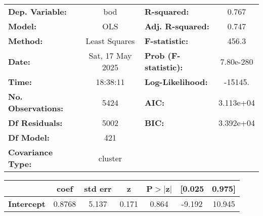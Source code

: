 \begin{center}
\begin{tabular}{lclc}
\toprule
\textbf{Dep. Variable:}                                                                             &       bod        & \textbf{  R-squared:         } &     0.767   \\
\textbf{Model:}                                                                                     &       OLS        & \textbf{  Adj. R-squared:    } &     0.747   \\
\textbf{Method:}                                                                                    &  Least Squares   & \textbf{  F-statistic:       } &     456.3   \\
\textbf{Date:}                                                                                      & Sat, 17 May 2025 & \textbf{  Prob (F-statistic):} & 7.80e-280   \\
\textbf{Time:}                                                                                      &     18:38:11     & \textbf{  Log-Likelihood:    } &   -15145.   \\
\textbf{No. Observations:}                                                                          &        5424      & \textbf{  AIC:               } & 3.113e+04   \\
\textbf{Df Residuals:}                                                                              &        5002      & \textbf{  BIC:               } & 3.392e+04   \\
\textbf{Df Model:}                                                                                  &         421      & \textbf{                     } &             \\
\textbf{Covariance Type:}                                                                           &     cluster      & \textbf{                     } &             \\
\bottomrule
\end{tabular}
\begin{tabular}{lcccccc}
                                                                                                    & \textbf{coef} & \textbf{std err} & \textbf{z} & \textbf{P$> |$z$|$} & \textbf{[0.025} & \textbf{0.975]}  \\
\midrule
\textbf{Intercept}                                                                                  &       0.8768  &        5.137     &     0.171  &         0.864        &       -9.192    &       10.945     \\

\end{tabular}
\end{center}
